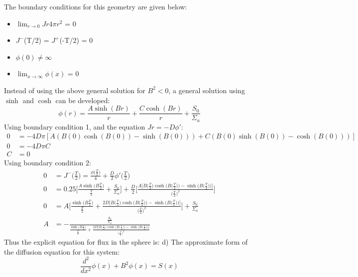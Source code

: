 \documentclass{amsart}
\theoremstyle{definition}
\begin{document}
\bigbreak
The boundary conditions for this geometry are given below:
\begin{itemize}
    \item $\lim_{r \rightarrow 0}Jr4\pi r^2$ = 0
    \item $J^-$(T/2) = $J^+$(-T/2) = 0
    \item $\phi(0) \neq \infty$
    \item $\lim_{x\to\infty} \phi(x)$ = 0
\end{itemize}
Instead of using the above general solution for $B^2 < 0$, a general solution using $\sinh$ and $\cosh$ can be developed:
\begin{equation*}
    \phi(r) = \frac{A\sinh(Br)}{r}+\frac{C\cosh(Br)}{r}+\frac{S_0}{\Sigma_a}
\end{equation*}
Using boundary condition 1, and the equation $Jr = -D\phi'$:
\begin{align*}
    0 &= -4D\pi[A(B(0)\cosh(B(0))-\sinh(B(0)))+C(B(0)\sinh(B(0))-\cosh(B(0)))] \\
    0 &= -4D\pi C \\
    C &= 0
\end{align*}
Using boundary condition 2:
\begin{align*}
    0 &= J^-\bigg(\frac{T}{2}\bigg) = \frac{\phi\bigg(\frac{T}{2}\bigg)}{4} +\frac{D}{2}\phi'\bigg(\frac{T}{2}\bigg) \\
    0 &= 0.25\Bigg[\frac{A\sinh\bigg(B\frac{T}{2}\bigg)}{\frac{T}{2}}+\frac{S_0}{\Sigma_a}\Bigg] +\frac{D}{2}\Bigg[\frac{A\bigg[B\bigg(\frac{T}{2}\bigg)\cosh\bigg(B\bigg(\frac{T}{2}\bigg)\bigg)-\sinh\bigg(B\bigg(\frac{T}{2}\bigg)\bigg)\bigg]}{\bigg(\frac{T}{2}\bigg)^2}\Bigg] \\
    0 &= A\Bigg[\frac{\sinh\bigg(B\frac{T}{2}\bigg)}{\frac{T}{2}}+\frac{2D\bigg[B\bigg(\frac{T}{2}\bigg)\cosh\bigg(B\bigg(\frac{T}{2}\bigg)\bigg)-\sinh\bigg(B\bigg(\frac{T}{2}\bigg)\bigg)\bigg]}{\bigg(\frac{T}{2}\bigg)^2}\Bigg]+\frac{S_0}{\Sigma_a} \\
    A &= -\frac{\frac{S_0}{\Sigma_a}}{\frac{\sinh\bigg(B\frac{T}{2}\bigg)}{\frac{T}{2}}+\frac{2D\bigg[B\bigg(\frac{T}{2}\bigg)\cosh\bigg(B\bigg(\frac{T}{2}\bigg)\bigg)-\sinh\bigg(B\bigg(\frac{T}{2}\bigg)\bigg)\bigg]}{\bigg(\frac{T}{2}\bigg)^2}}
\end{align*}
Thus the explicit equation for flux in the sphere is:
\bigbreak
{}
\newpage
\bigbreak
d) The approximate form of the diffusion equation for this system:
\bigbreak
\begin{equation*}
    \frac{d^2}{dx^2}\phi(x) + B^2\phi(x) = S(x)
\end{equation*}
 
\end{document}
